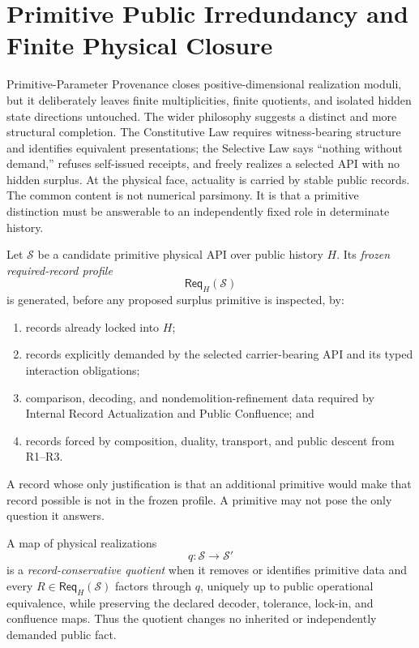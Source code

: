 
\section{Primitive Public Irredundancy and Finite Physical Closure}
\label{sec:primitive-public-irredundancy}

Primitive-Parameter Provenance closes positive-dimensional realization moduli, but
it deliberately leaves finite multiplicities, finite quotients, and isolated hidden
state directions untouched.  The wider philosophy suggests a distinct and more
structural completion.  The Constitutive Law requires witness-bearing structure and
identifies equivalent presentations; the Selective Law says ``nothing without
demand,'' refuses self-issued receipts, and freely realizes a selected API with no
hidden surplus.  At the physical face, actuality is carried by stable public records.
The common content is not numerical parsimony.  It is that a primitive distinction
must be answerable to an independently fixed role in determinate history.

\begin{definition}
Let \(\mathcal S\) be a candidate primitive physical API over public history \(H\).
Its \emph{frozen required-record profile}
\[
  \mathsf{Req}_H(\mathcal S)
\]
is generated, before any proposed surplus primitive is inspected, by:
\begin{enumerate}[label=\textup{R\arabic*},leftmargin=2.4em]
\item records already locked into \(H\);
\item records explicitly demanded by the selected carrier-bearing API and its
      typed interaction obligations;
\item comparison, decoding, and nondemolition-refinement data required by Internal
      Record Actualization and Public Confluence; and
\item records forced by composition, duality, transport, and public descent from
      R1--R3.
\end{enumerate}
A record whose only justification is that an additional primitive would make that
record possible is not in the frozen profile.  A primitive may not pose the only
question it answers.
\end{definition}

\begin{definition}
A map of physical realizations
\[
  q:\mathcal S\longrightarrow\mathcal S'
\]
is a \emph{record-conservative quotient} when it removes or identifies primitive
data and every \(R\in\mathsf{Req}_H(\mathcal S)\) factors through \(q\), uniquely up
to public operational equivalence, while preserving the declared decoder,
tolerance, lock-in, and confluence maps.  Thus the quotient changes no inherited or
independently demanded public fact.
\end{definition}


